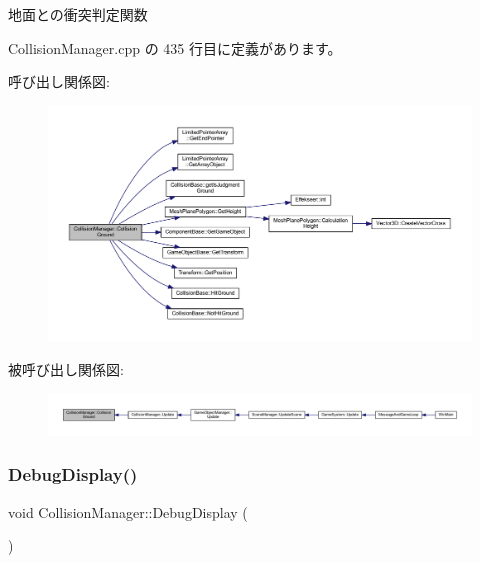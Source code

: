 地面との衝突判定関数 



 Collision\+Manager.\+cpp の 435 行目に定義があります。

呼び出し関係図\+:\nopagebreak
\begin{figure}[H]
\begin{center}
\leavevmode
\includegraphics[width=350pt]{class_collision_manager_a1d67f4076eb71e191db5cff4e5abe3b0_cgraph}
\end{center}
\end{figure}
被呼び出し関係図\+:
\nopagebreak
\begin{figure}[H]
\begin{center}
\leavevmode
\includegraphics[width=350pt]{class_collision_manager_a1d67f4076eb71e191db5cff4e5abe3b0_icgraph}
\end{center}
\end{figure}
\mbox{\label{class_collision_manager_a4da1241f3905c3855b31d7e20ceed5a1}} 
\subsubsection{\texorpdfstring{Debug\+Display()}{DebugDisplay()}}
{\footnotesize\ttfamily void Collision\+Manager\+::\+Debug\+Display (\begin{DoxyParamCaption}{ }\end{DoxyParamCaption})\hspace{0.3cm}{\ttfamily [private]}}



